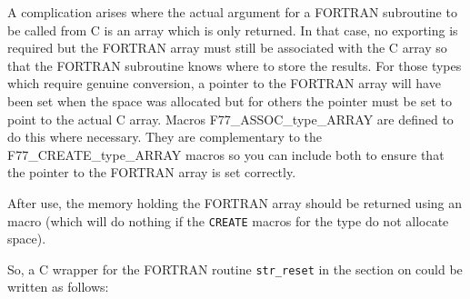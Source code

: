 \documentclass[twoside,11pt,nolof]{starlink}
\begin{document}
A complication arises where the actual argument for a FORTRAN subroutine to be
called from C is an array which is only returned.
In that case, no exporting is
required but the FORTRAN array must still be associated with the C array so
that the FORTRAN subroutine knows where to store the results.
For those types which require genuine conversion, a pointer to the FORTRAN
array will have been set when the space was allocated but for others the
pointer must be set to point to the actual C array.
Macros
{F77_ASSOC_type_ARRAY}
are defined to do this where necessary.
They are complementary to the
{F77_CREATE_type_ARRAY}
macros so you can include both to ensure that the pointer to the FORTRAN array
is set correctly.

After use, the memory holding the FORTRAN array should be returned using an
macro (which will do nothing if the \texttt{CREATE} macros for the type do not
allocate space).

So, a C wrapper for the FORTRAN routine \texttt{str\_reset} in the section on
could be written as follows:
\end{document}
